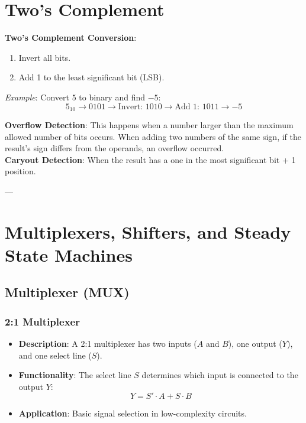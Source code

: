 \documentclass[10pt]{article}
\begin{document}
\begin{multicols*}{2}
\section{Two's Complement}
\textbf{Two's Complement Conversion}:
\begin{enumerate}\itemsep0pt
    \item Invert all bits.
    \item Add 1 to the least significant bit (LSB).
\end{enumerate}
\textit{Example}: Convert \(5\) to binary and find \(-5\):
\[
5_{10} \rightarrow 0101 \rightarrow \text{Invert: } 1010 \rightarrow \text{Add 1: } 1011 \rightarrow -5
\]

\textbf{Overflow Detection}: This happens when a number larger than the maximum 
allowed number of bits occurs. When adding two numbers of the same sign, if the result’s sign differs from the operands, an overflow occurred.
\\
\textbf{Caryout Detection}: When the result has a one in the most significant bit + 1 position.

--- %

\section{Multiplexers, Shifters, and Steady State Machines}

\subsection{Multiplexer (MUX)}
\subsubsection{2:1 Multiplexer}
\begin{itemize}
    \item \textbf{Description}: A 2:1 multiplexer has two inputs (\( A \) and \( B \)), one output (\( Y \)), and one select line (\( S \)).
    \item \textbf{Functionality}: The select line \( S \) determines which input is connected to the output \( Y \):
    \[
    Y = S' \cdot A + S \cdot B
    \]
    
    \item \textbf{Application}: Basic signal selection in low-complexity circuits.
\end{itemize}


\end{multicols*}
\end{document}
